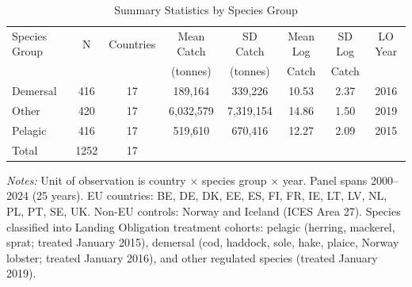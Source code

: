 \begin{table}[htbp]
\centering
\caption{Summary Statistics by Species Group}
\label{tab:summary}
\small
\begin{tabular}{lccccccc}
\hline\hline
Species Group & N & Countries & Mean Catch & SD Catch & Mean Log & SD Log & LO Year \\
 & & & (tonnes) & (tonnes) & Catch & Catch & \\
\hline
Demersal & 416 & 17 & 189,164 & 339,226 & 10.53 & 2.37 & 2016 \\
Other & 420 & 17 & 6,032,579 & 7,319,154 & 14.86 & 1.50 & 2019 \\
Pelagic & 416 & 17 & 519,610 & 670,416 & 12.27 & 2.09 & 2015 \\
\hline
Total & 1252 & 17 & & & & & \\
\hline\hline
\end{tabular}
\begin{tablenotes}[flushleft]
\small
\item \textit{Notes:} Unit of observation is country $\times$ species group $\times$ year. Panel spans 2000--2024 (25 years). EU countries: BE, DE, DK, EE, ES, FI, FR, IE, LT, LV, NL, PL, PT, SE, UK. Non-EU controls: Norway and Iceland (ICES Area 27). Species classified into Landing Obligation treatment cohorts: pelagic (herring, mackerel, sprat; treated January 2015), demersal (cod, haddock, sole, hake, plaice, Norway lobster; treated January 2016), and other regulated species (treated January 2019).
\end{tablenotes}
\end{table}
